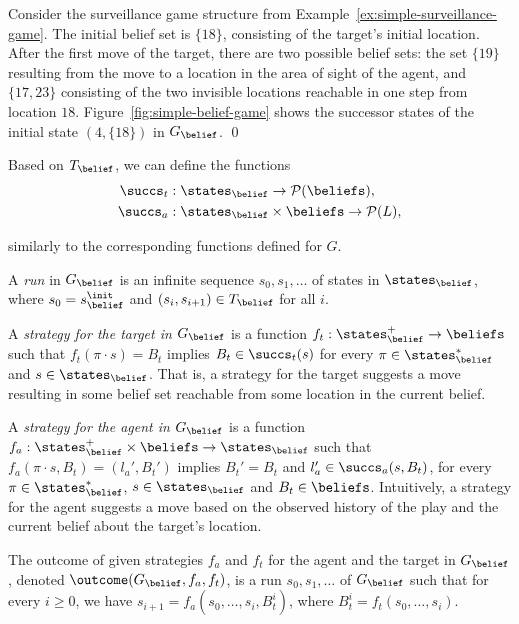 \bigskip 
\begin{eg}\label{ex:simple-belief-game}
Consider the surveillance game structure from Example~\ref{ex:simple-surveillance-game}. The initial belief set is $\{18\}$, consisting of the target's initial location. After the first move of the target, there are two possible belief sets: the set $\{19\}$ resulting from the move to a location in the area of sight of the agent, and $\{17,23\}$ consisting of the two invisible locations reachable in one step from location $18$.
Figure~\ref{fig:simple-belief-game} shows the successor states of the initial state $(4,\{18\})$ in $G_\belief$. \qed
\end{eg}

\bigskip

Based on  $T_\belief$, we can define the functions 
\begin{align*}
    \succs_t &: \states_\belief \to \mathcal{P}(\beliefs), \\
    \succs_a &: \states_\belief \times \beliefs \to \mathcal{P}(L),
\end{align*}

similarly to the corresponding functions defined for $G$. 

\bigskip

A \emph{run} in $G_\belief$ is an infinite sequence $s_0,s_1,\ldots$ of states in $\states_\belief$, where $s_0 = s_\belief^\init$ and $(s_i,s_{i+1}) \in T_\belief$ for all $i$. 

A \emph{strategy for the target in $G_\belief$} is a function $f_t: \states_\belief^+ \to \beliefs$ such that $f_t(\pi\cdot s) = B_t$ implies $B_t \in \succs_t(s)$ for every $\pi \in \states_\belief^*$ and $s \in \states_\belief$. That is, a strategy for the target suggests a move resulting in some belief set reachable from some location in the current belief.

A \emph{strategy for the agent in $G_\belief$} is a function $f_a : \states_\belief^+ \times \beliefs \to \states_\belief$ such that $f_a(\pi\cdot s,B_t) = (l_a',B_t')$ implies $B_t' = B_t$ and $l_a' \in \succs_a(s,B_t)$, for every $\pi \in \states_\belief^*$, $s \in \states_\belief$ and $B_t \in \beliefs$. Intuitively, a strategy for the agent suggests a move based on the observed history of the play and the current belief about the target's location.

The outcome of given strategies $f_a$ and $f_t$ for the agent and the target in $G_\belief$, denoted $\outcome(G_\belief,f_a,f_t)$, is a run $s_0,s_1,\ldots$ of $G_\belief$ such that for every $i \geq 0$, we have $s_{i+1} = f_a(s_0,\ldots,s_i,B_t^i)$, where $B_t^i = f_t(s_0,\ldots,s_i)$.

